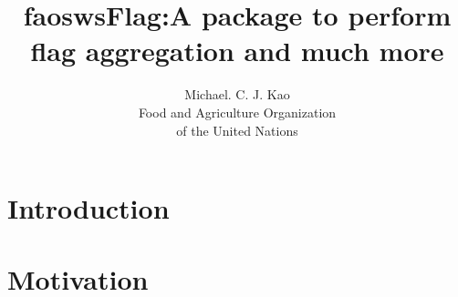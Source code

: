 \documentclass[nojss]{jss}
\title{\bf faoswsFlag:A package to perform \\flag aggregation and much
  more}
\author{Michael. C. J. Kao\\ Food and Agriculture Organization \\ of
  the United Nations}
\begin{document}
\section{Introduction}

\section{Motivation}
\end{document}
